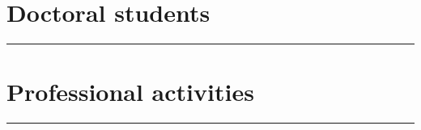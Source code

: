 \documentclass[11pt,plain,titleabove]{simple_cv_hmg}
\begin{document}
  \section{Doctoral students }
  \vspace{-1cm}
  \rule{\textwidth}{0.5pt}
    
  \vspace{-0.3cm}


  \section{Professional activities}
  \vspace{-1cm}
  \rule{\textwidth}{0.5pt}
  
  \vspace{-0.5cm}







\fi 


% 




%
%
%
\end{document}
